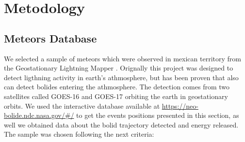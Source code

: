\documentclass[times,twocolumn,final,authoryear]{elsarticle}
\begin{document}






\section{Metodology}
\subsection{Meteors Database}

We selected a sample of meteors which were observed in mexican territory from the Geostationary Lightning Mapper \citep{GOODMAN:2013}. Orignally this project was designed to detect ligthning activity in earth's athmosphere, but has been proven that also can detect bolides entering the athmosphere. The detection comes from two satellites called GOES-16 and GOES-17 orbiting the earth in geostationary orbits. We used the interactive database available at \url{https://neo-bolide.ndc.nasa.gov/#/} to get the events positions presented in this section, as well we obtained data about the bolid trajectory detected and energy released. The sample was chosen following the next criteria:%
\end{document}
